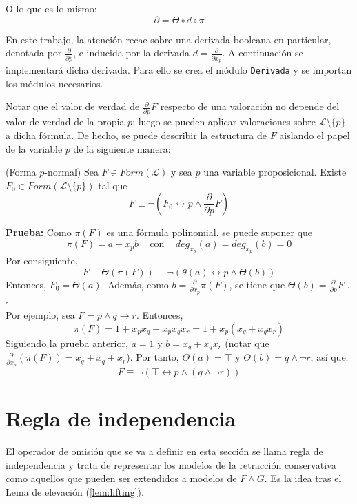  \noindent O lo que es lo mismo: $$\partial = \Theta \circ d \circ \pi $$
 
 En este trabajo, la atención recae sobre una derivada booleana en particular, denotada por $\frac{\partial}{\partial p}$, e inducida por la derivada $d = \frac{\partial}{\partial x_p}$. A continuación se implementará dicha derivada. Para ello se crea el módulo \texttt{Derivada} y se importan los módulos necesarios.

  
Notar que el valor de verdad de $\frac{\partial}{\partial p}F$ respecto de una valoración no depende del valor de verdad de la propia $p$; luego se pueden aplicar valoraciones sobre $\mathcal{L} \setminus \{ p \}$ a dicha fórmula. De hecho, se puede describir la estructura de $F$ aislando el papel de la variable $p$ de la siguiente manera:

\newpage 

\lem \cite{Borrego2009} (Forma $p$-normal) Sea $F \in Form(\mathcal{L})$ y sea $p$ una variable proposicional. Existe $F_0 \in Form (\mathcal{L} \setminus \{ p \})$ tal que 
$$F \equiv \neg (F_0 \leftrightarrow p \wedge \frac{\partial}{\partial p} F)$$

\noindent \textbf{Prueba:} Como $\pi (F)$ es una fórmula polinomial, se puede suponer que
$$\pi (F) = a + x_p b \;\;\; \text{ con } \;\;\; deg_{x_p} (a) = deg_{x_p} (b) = 0$$
\noindent Por consiguiente,
$$F \equiv \Theta (\pi (F)) \equiv \neg (\theta (a) \leftrightarrow p \wedge \Theta (b)) $$
Entonces, $F_0 = \Theta (a)$. Además, como $b=\frac{\partial}{\partial x_p} \pi (F)$, se tiene que $\Theta (b) = \frac{\partial}{\partial p} F$ . \hspace{1cm} $\square$ \\

Por ejemplo, sea $F=p \wedge q \rightarrow r$. Entonces,
$$\pi (F) = 1+x_px_q + x_px_qx_r = 1+x_p (x_q+x_qx_r)$$
Siguiendo la prueba anterior, $a=1$ y $b=x_q+x_qx_r$ (notar que $\frac{\partial}{\partial x_p} (\pi (F))=x_q+x_q+x_r$). Por tanto, $\Theta (a) = \top$ y $\Theta (b)=q \wedge \neg r$, así que:
$$F \equiv \neg (\top \leftrightarrow p \wedge (q \wedge \neg r))$$

\newpage

\section{Regla de independencia}
El operador de omisión que se va a definir en esta sección se llama regla de independencia y trata de representar los modelos de la retracción conservativa como aquellos que pueden ser extendidos a modelos de $F \wedge G$. Es la idea tras el Lema de elevación (\ref{lem:lifting}).\\

